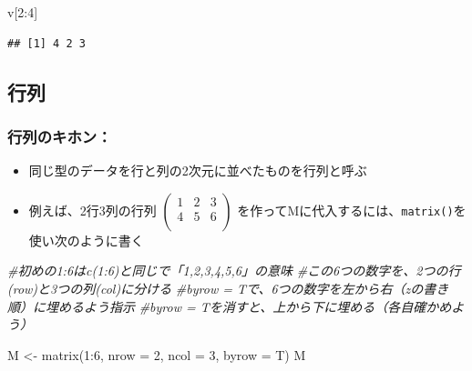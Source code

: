 \documentclass[
]{book}
\newenvironment{Shaded}{\begin{snugshade}}{\end{snugshade}}
\newcommand{\AttributeTok}[1]{\textcolor[rgb]{0.77,0.63,0.00}{#1}}
\newcommand{\CommentTok}[1]{\textcolor[rgb]{0.56,0.35,0.01}{\textit{#1}}}
\newcommand{\DecValTok}[1]{\textcolor[rgb]{0.00,0.00,0.81}{#1}}
\newcommand{\FunctionTok}[1]{\textcolor[rgb]{0.00,0.00,0.00}{#1}}
\newcommand{\NormalTok}[1]{#1}
\newcommand{\OtherTok}[1]{\textcolor[rgb]{0.56,0.35,0.01}{#1}}
\newcommand{\SpecialCharTok}[1]{\textcolor[rgb]{0.00,0.00,0.00}{#1}}
\providecommand{\tightlist}{%
  \setlength{\itemsep}{0pt}\setlength{\parskip}{0pt}}
\begin{document}
\begin{Shaded}
\begin{Highlighting}[]
\NormalTok{v[}\DecValTok{2}\SpecialCharTok{:}\DecValTok{4}\NormalTok{]}
\end{Highlighting}
\end{Shaded}

\begin{verbatim}
## [1] 4 2 3
\end{verbatim}

\hypertarget{ux884cux5217}{%
\subsection{行列}\label{ux884cux5217}}

\hypertarget{ux884cux5217ux306eux30adux30dbux30f3}{%
\subsubsection*{行列のキホン：}\label{ux884cux5217ux306eux30adux30dbux30f3}}

\begin{itemize}
\tightlist
\item
  同じ型のデータを行と列の2次元に並べたものを行列と呼ぶ
\item
  例えば、2行3列の行列
  \(\begin{pmatrix} 1 & 2 & 3 \\ 4 & 5 & 6 \\ \end{pmatrix}\)
  を作ってMに代入するには、\texttt{matrix()}を使い次のように書く
\end{itemize}

\begin{Shaded}
\begin{Highlighting}[]
\CommentTok{\#初めの1:6はc(1:6)と同じで「1,2,3,4,5,6」の意味}
\CommentTok{\#この6つの数字を、2つの行(row)と3つの列(col)に分ける}
\CommentTok{\#byrow = Tで、6つの数字を左から右（zの書き順）に埋めるよう指示}
\CommentTok{\#byrow = Tを消すと、上から下に埋める（各自確かめよう）}

\NormalTok{M }\OtherTok{\textless{}{-}} \FunctionTok{matrix}\NormalTok{(}\DecValTok{1}\SpecialCharTok{:}\DecValTok{6}\NormalTok{, }\AttributeTok{nrow =} \DecValTok{2}\NormalTok{, }\AttributeTok{ncol =} \DecValTok{3}\NormalTok{, }\AttributeTok{byrow =}\NormalTok{ T)}
\NormalTok{M}
\end{Highlighting}
\end{Shaded}
\end{document}
